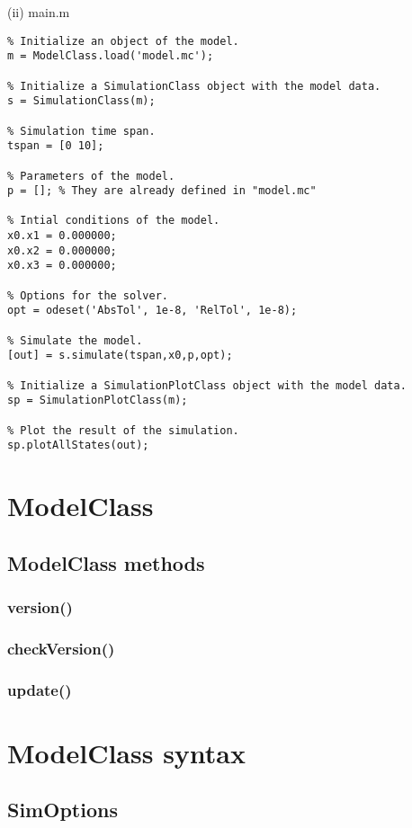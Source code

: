 \documentclass[11pt]{article}
\begin{document}
(ii) main.m

\begin{lstlisting}
% Initialize an object of the model.
m = ModelClass.load('model.mc');

% Initialize a SimulationClass object with the model data.
s = SimulationClass(m);

% Simulation time span.
tspan = [0 10];

% Parameters of the model.
p = []; % They are already defined in "model.mc"

% Intial conditions of the model.
x0.x1 = 0.000000;
x0.x2 = 0.000000;
x0.x3 = 0.000000;

% Options for the solver.
opt = odeset('AbsTol', 1e-8, 'RelTol', 1e-8);

% Simulate the model.
[out] = s.simulate(tspan,x0,p,opt);

% Initialize a SimulationPlotClass object with the model data.
sp = SimulationPlotClass(m);

% Plot the result of the simulation.
sp.plotAllStates(out);
\end{lstlisting}

\section{ModelClass}

\subsection{ModelClass methods}

\subsubsection{version()}

\subsubsection{checkVersion()}

\subsubsection{update()}

\section{ModelClass syntax}

\subsection{SimOptions}
\end{document}
